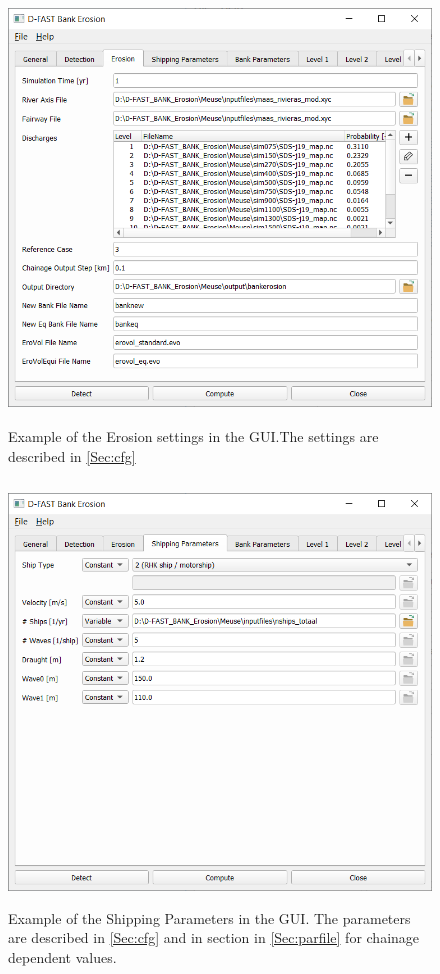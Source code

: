 \begin{figure}[!h]
	\center 
	\includegraphics[width=\textwidth,height=11.4cm]{figures/gui3.png}
	\caption{Example of the Erosion settings in the GUI.The settings are described in \autoref{Sec:cfg}}
	\label{guiErode}
\end{figure}


\clearpage
\begin{figure}[!ht]
\center
\vspace{-0.75cm} 
\includegraphics[width=\textwidth,height=11.2cm]{figures/gui4.png}
\caption{Example of the Shipping Parameters in the GUI. The parameters are described in \autoref{Sec:cfg} and in section in \autoref{Sec:parfile} for chainage dependent values.}
\label{guiShip}
\end{figure}

